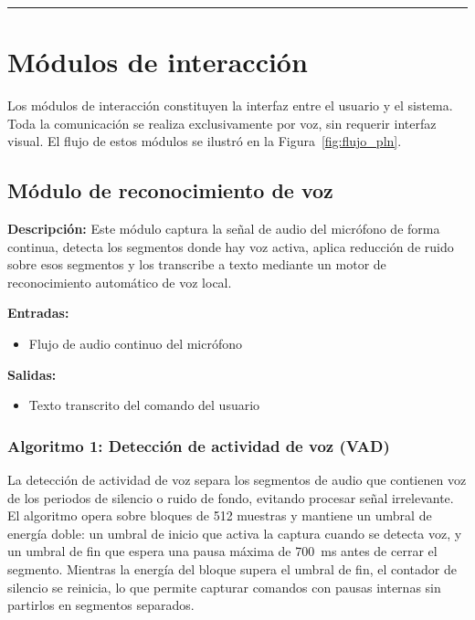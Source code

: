\vspace{-0.9cm}
\rule{\textwidth}{0.4pt}

\section{Módulos de interacción}

Los módulos de interacción constituyen la interfaz entre el usuario y el sistema.
Toda la comunicación se realiza exclusivamente por voz, sin requerir interfaz visual.
El flujo de estos módulos se ilustró en la Figura~\ref{fig:flujo_pln}.


\subsection{Módulo de reconocimiento de voz}

\textbf{Descripción:}
Este módulo captura la señal de audio del micrófono de forma continua, detecta los
segmentos donde hay voz activa, aplica reducción de ruido sobre esos segmentos y
los transcribe a texto mediante un motor de reconocimiento automático de voz local.

\textbf{Entradas:}
\begin{itemize}
    \item Flujo de audio continuo del micrófono
\end{itemize}

\textbf{Salidas:}
\begin{itemize}
    \item Texto transcrito del comando del usuario
\end{itemize}

\subsubsection{Algoritmo 1: Detección de actividad de voz (VAD)}

La detección de actividad de voz separa los segmentos de audio que contienen voz de
los periodos de silencio o ruido de fondo, evitando procesar señal irrelevante. El
algoritmo opera sobre bloques de 512 muestras y mantiene un umbral de energía doble:
un umbral de inicio que activa la captura cuando se detecta voz, y un umbral de fin
que espera una pausa máxima de 700~ms antes de cerrar el segmento. Mientras la energía
del bloque supera el umbral de fin, el contador de silencio se reinicia, lo que permite
capturar comandos con pausas internas sin partirlos en segmentos separados.

